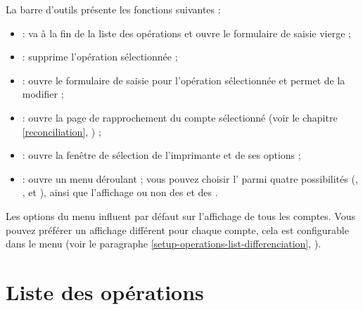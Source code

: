 La barre d'outils présente les fonctions suivantes  : 

\begin{itemize}
	 \item {} : va à la fin de la liste des opérations et ouvre le formulaire de saisie vierge ;
	 \item {} : supprime l'opération sélectionnée ;
	 \item {} : ouvre le formulaire de saisie pour l'opération sélectionnée et permet de la modifier ;
	 \item {} : ouvre la page de rapprochement du compte sélectionné (voir le chapitre \vref{reconciliation}, ) ;
	 \item {} : ouvre la fenêtre de sélection de l'imprimante et de ses
	options ;
	 \item {} : ouvre un menu déroulant ; vous pouvez choisir l' parmi quatre possibilités (, ,  et ), ainsi que l'affichage ou non des  et des .
\end{itemize}

Les options du menu  influent par défaut sur l'affichage de tous les comptes. Vous pouvez préférer un affichage différent pour chaque compte, cela est configurable dans le menu   (voir le paragraphe \vref{setup-operations-list-differenciation}, ).
 


\section{Liste des opérations\label{transactions-list}}


